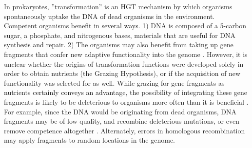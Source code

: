 \documentclass[PhD]{msu-thesis}
\begin{document}
In prokaryotes, ''transformation'' is an HGT mechanism by which organisms spontaneously uptake the DNA of dead organisms in the environment. Competent organisms benefit in several ways. 1) DNA is composed of a 5-carbon sugar, a phosphate, and nitrogenous bases, materials that are useful for DNA synthesis and repair. 2) The organisms may also benefit from taking up
gene fragments that confer new adaptive functionality into the genome \cite{vos_why_2009}. However, it is unclear whether the origins of transformation functions were developed solely in order to obtain nutrients (the Grazing Hypothesis), or if the acquisition of new functionality was selected for as well. While grazing for gene fragments as nutrients certainly conveys an advantage, the possibility of integrating these gene fragments is likely to be deleterious to organisms more often than it is beneficial \cite{redfield_evolution_1997}. For example, since the DNA would be originating from dead organisms, DNA fragments may be of low quality, and recombine deleterious mutations, or even remove competence altogether \cite{redfield_evolution_1997}. Alternately, errors in homologous recombination may apply fragments to random locations in the genome.    
\end{document}
